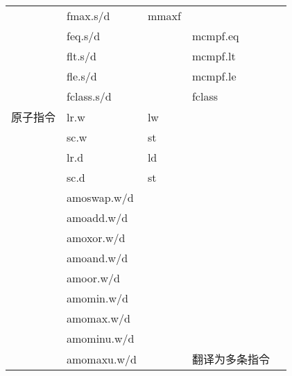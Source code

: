 \begin{longtable}{lllll}
                               & fmax.s/d                         & mmaxf                        &                                \\
                               & feq.s/d                          &                              & mcmpf.eq                       \\
                               & flt.s/d                          &                              & mcmpf.lt                       \\
                               & fle.s/d                          &                              & mcmpf.le                       \\
                               & fclass.s/d                       &                              & fclass                         \\
                               \hline
    原子指令                       & lr.w                             & lw                           &                                \\
                               & sc.w                             & st                           &                                \\
                               & lr.d                             & ld                           &                                \\
                               & sc.d                             & st                           &                                \\
                               & amoswap.w/d                      &                              &                                \\
                               & amoadd.w/d                       &                              &                                \\
                               & amoxor.w/d                       &                              &                                \\
                               & amoand.w/d                       &                              &                                \\
                               & amoor.w/d                        &                              &                                \\
                               & amomin.w/d                       &                              &                                \\
                               & amomax.w/d                       &                              &                                \\
                               & amominu.w/d                      &                              &                                \\
    \multirow{-9}{*}{}         & amomaxu.w/d                      & \multirow{-9}{*}{}           & \multirow{-9}{*}{翻译为多条指令}      \\

\end{longtable}
